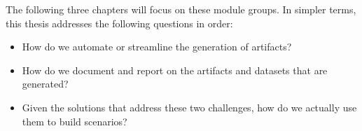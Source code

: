 The following three chapters will focus on these module groups. In
simpler terms, this thesis addresses the following questions in order:

\begin{itemize}
\tightlist
\item
  How do we automate or streamline the generation of artifacts?
\item
  How do we document and report on the artifacts and datasets that are
  generated?
\item
  Given the solutions that address these two challenges, how do we
  actually use them to build scenarios?
\end{itemize}
